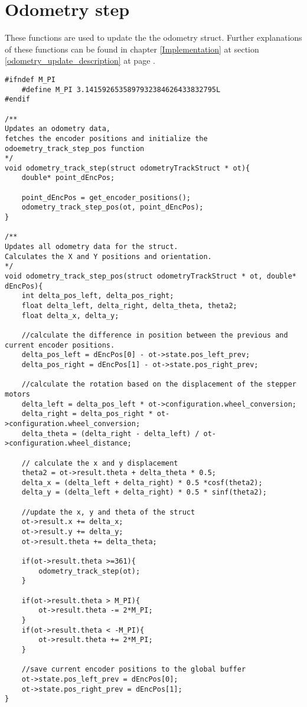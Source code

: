 \section{Odometry step}
\label{odometry_update_code}
These functions are used to update the the odometry struct.
Further explanations of these functions can be found in chapter \ref{Implementation} at section \ref{odometry_update_description} at page \pageref{odometry_update_description}.
\begin{lstlisting}[caption = {Updating odometry struct}]
#ifndef M_PI
	#define M_PI 3.1415926535897932384626433832795L
#endif

/**
Updates an odometry data,
fetches the encoder positions and initialize the 
odoemetry_track_step_pos function
*/
void odometry_track_step(struct odometryTrackStruct * ot){
	double* point_dEncPos;
	
	point_dEncPos = get_encoder_positions();
	odometry_track_step_pos(ot,	point_dEncPos);
}

/**
Updates all odometry data for the struct.
Calculates the X and Y positions and orientation. 
*/
void odometry_track_step_pos(struct odometryTrackStruct * ot, double* dEncPos){
	int delta_pos_left, delta_pos_right;
	float delta_left, delta_right, delta_theta, theta2;
	float delta_x, delta_y;
	
	//calculate the difference in position between the previous and current encoder positions. 
	delta_pos_left = dEncPos[0] - ot->state.pos_left_prev;
	delta_pos_right = dEncPos[1] - ot->state.pos_right_prev;
	
	//calculate the rotation based on the displacement of the stepper motors 
	delta_left = delta_pos_left * ot->configuration.wheel_conversion;
	delta_right = delta_pos_right * ot->configuration.wheel_conversion;
	delta_theta = (delta_right - delta_left) / ot->configuration.wheel_distance;
	
	// calculate the x and y displacement 
	theta2 = ot->result.theta + delta_theta * 0.5;
	delta_x = (delta_left + delta_right) * 0.5 *cosf(theta2); 
	delta_y = (delta_left + delta_right) * 0.5 * sinf(theta2);
	
	//update the x, y and theta of the struct
	ot->result.x += delta_x;
	ot->result.y += delta_y;
	ot->result.theta += delta_theta;

	if(ot->result.theta >=361){
		odometry_track_step(ot);
	}
	
	if(ot->result.theta > M_PI){
		ot->result.theta -= 2*M_PI;
	}
	if(ot->result.theta < -M_PI){
		ot->result.theta += 2*M_PI;
	}
	
	//save current encoder positions to the global buffer 
	ot->state.pos_left_prev = dEncPos[0];
	ot->state.pos_right_prev = dEncPos[1]; 
}
\end{lstlisting}

